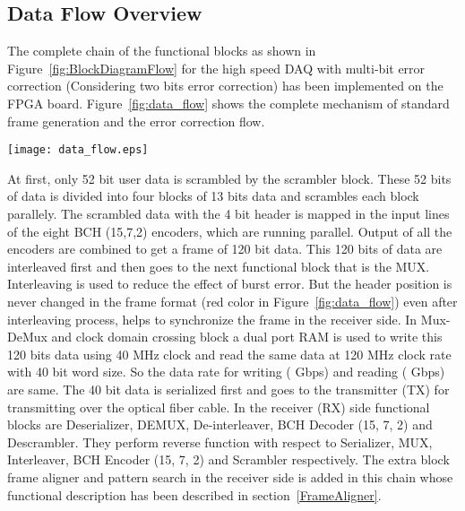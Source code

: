 \documentclass[10pt, conference, compsocconf]{IEEEtran}
\begin{document}
\subsection{Data Flow Overview}
 The complete chain of the functional blocks as shown in Figure~\ref{fig:BlockDiagramFlow} for the high speed DAQ with multi-bit error correction (Considering two bits error correction) has been implemented on the FPGA board. Figure~\ref{fig:data_flow} shows the complete mechanism of standard frame generation and the error correction flow.
\begin{figure*}[htb]
\centering
\texttt{[image: data\_flow.eps]}
\vspace{-10 pt}
\caption{Standard frame generation and Error correction flow}
\label{fig:data_flow}
\vspace{-15 pt}
\end{figure*}
 At first, only 52 bit user data is scrambled by the scrambler block. These 52 bits of data is divided into four blocks of 13 bits data and scrambles each block parallely. The scrambled data with the 4 bit header is mapped in the input lines of the eight BCH (15,7,2) encoders, which are running parallel.  Output of all the encoders are combined to get a frame of 120 bit data. This 120 bits of data are interleaved first and then goes to the next functional block that is the MUX. Interleaving is used to reduce the effect of burst error. But the header position is never changed in the frame format (red color in Figure~\ref{fig:data_flow}) even after interleaving process, helps to synchronize the frame in the receiver side. In Mux-DeMux and clock domain crossing block a dual port RAM is used to write this 120 bits data using 40 MHz clock and read the same data at 120 MHz clock rate with 40 bit word size. So the data rate for writing ( Gbps) and reading ( Gbps) are same. The 40 bit data is serialized first and goes to the transmitter (TX) for transmitting over the optical fiber cable. In the receiver (RX) side functional blocks are Deserializer, DEMUX, De-interleaver, BCH Decoder (15, 7, 2) and Descrambler. They perform reverse function with respect to Serializer, MUX, Interleaver, BCH Encoder (15, 7, 2) and Scrambler respectively. The extra block frame aligner and pattern search in the receiver side is added in this chain whose functional description has been described in section~\ref{FrameAligner}.



\iffalse.Figure~\ref{fig:FrameAlignerWork} shows how this block works.\fi   
\end{document}
